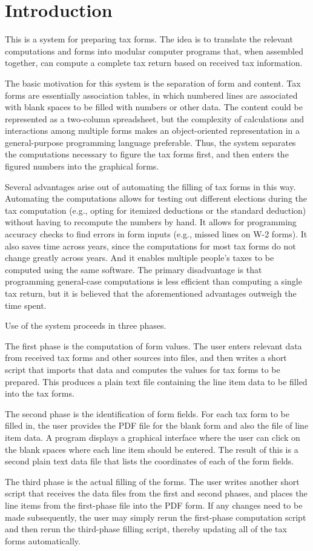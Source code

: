 \section{Introduction}

This is a system for preparing tax forms. The idea is to translate the relevant
computations and forms into modular computer programs that, when assembled
together, can compute a complete tax return based on received tax information.

The basic motivation for this system is the separation of form and content. Tax
forms are essentially association tables, in which numbered lines are associated
with blank spaces to be filled with numbers or other data. The content could be
represented as a two-column spreadsheet, but the complexity of calculations and
interactions among multiple forms makes an object-oriented representation
in a general-purpose programming language preferable. Thus, the system separates
the computations necessary to figure the tax forms first, and then enters the
figured numbers into the graphical forms.

Several advantages arise out of automating the filling of tax forms in this way.
Automating the computations allows for testing out different elections during
the tax computation (e.g., opting for itemized deductions or the standard
deduction) without having to recompute the numbers by hand. It allows for
programming accuracy checks to find errors in form inputs (e.g., missed lines on
W-2 forms). It also saves time across years, since the computations for most tax
forms do not change greatly across years. And it enables multiple people's taxes
to be computed using the same software. The primary disadvantage is that
programming general-case computations is less efficient than computing a single
tax return, but it is believed that the aforementioned advantages outweigh the
time spent.

Use of the system proceeds in three phases.

The first phase is the computation of form values. The user enters relevant data
from received tax forms and other sources into files, and then writes a short
script that imports that data and computes the values for tax forms to be
prepared. This produces a plain text file containing the line item data to be
filled into the tax forms.

The second phase is the identification of form fields. For each tax form to be
filled in, the user provides the PDF file for the blank form and also the file
of line item data. A program displays a graphical interface where the user can
click on the blank spaces where each line item should be entered. The result of
this is a second plain text data file that lists the coordinates of each of the
form fields.

The third phase is the actual filling of the forms. The user writes another
short script that receives the data files from the first and second phases, and
places the line items from the first-phase file into the PDF form. If any
changes need to be made subsequently, the user may simply rerun the first-phase
computation script and then rerun the third-phase filling script, thereby
updating all of the tax forms automatically.




